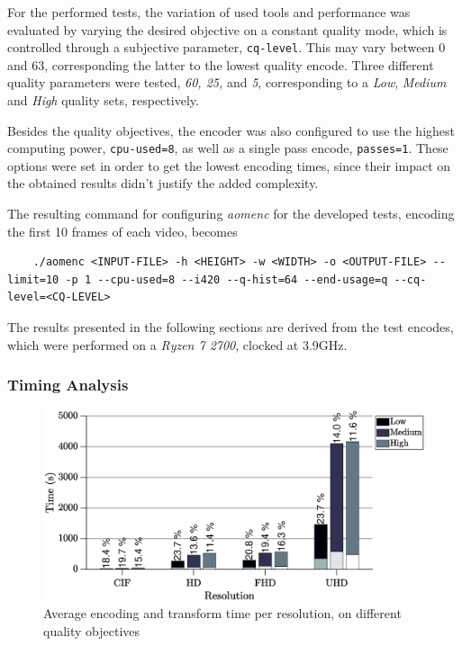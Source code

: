For the performed tests, the variation of used tools and performance was evaluated by varying the desired objective on a constant quality mode, which is controlled through a subjective parameter, \texttt{cq-level}. This may vary between 0 and 63, corresponding the latter to the lowest quality encode. Three different quality parameters were tested, \emph{60, 25,} and \emph{5}, corresponding to a \emph{Low}, \emph{Medium} and \emph{High} quality sets, respectively.

Besides the quality objectives, the encoder was also configured to use the highest computing power, \texttt{cpu-used=8}, as well as a single pass encode, \texttt{passes=1}. These options were set in order to get the lowest encoding times, since their impact on the obtained results didn't justify the added complexity.

The resulting command for configuring \emph{aomenc} for the developed tests, encoding the first 10 frames of each video, becomes

\begin{lstlisting}
    ./aomenc <INPUT-FILE> -h <HEIGHT> -w <WIDTH> -o <OUTPUT-FILE> --limit=10 -p 1 --cpu-used=8 --i420 --q-hist=64 --end-usage=q --cq-level=<CQ-LEVEL>
\end{lstlisting}

The results presented in the following sections are derived from the test encodes, which were performed on a \emph{Ryzen 7 2700}, clocked at 3.9GHz.

\subsubsection{Timing Analysis}

\begin{figure}[h]
    \centering
    \includegraphics[width=\textwidth]{Sections/3Transforms/Images/TimingAnalysisAvg.eps}
    \caption{Average encoding and transform time per resolution, on different quality objectives}
    \label{fig:timeavg}
\end{figure}

\clearpage
\printbibliography[heading=subbibliography]

